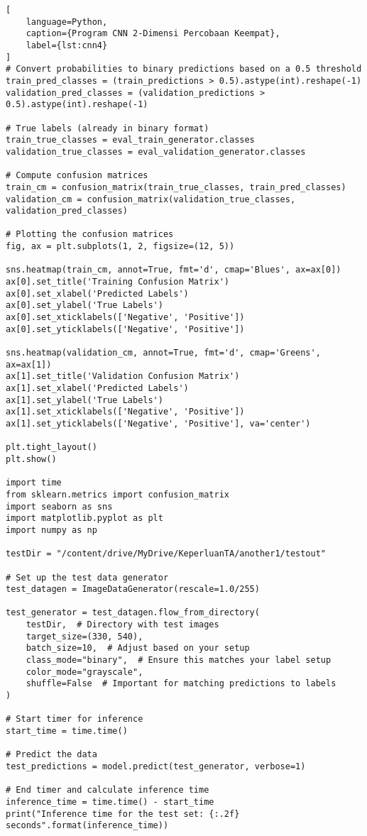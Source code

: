 \begin{lstlisting}[
    language=Python,
    caption={Program CNN 2-Dimensi Percobaan Keempat},
    label={lst:cnn4}
]
# Convert probabilities to binary predictions based on a 0.5 threshold
train_pred_classes = (train_predictions > 0.5).astype(int).reshape(-1)
validation_pred_classes = (validation_predictions > 0.5).astype(int).reshape(-1)

# True labels (already in binary format)
train_true_classes = eval_train_generator.classes
validation_true_classes = eval_validation_generator.classes

# Compute confusion matrices
train_cm = confusion_matrix(train_true_classes, train_pred_classes)
validation_cm = confusion_matrix(validation_true_classes, validation_pred_classes)

# Plotting the confusion matrices
fig, ax = plt.subplots(1, 2, figsize=(12, 5))

sns.heatmap(train_cm, annot=True, fmt='d', cmap='Blues', ax=ax[0])
ax[0].set_title('Training Confusion Matrix')
ax[0].set_xlabel('Predicted Labels')
ax[0].set_ylabel('True Labels')
ax[0].set_xticklabels(['Negative', 'Positive'])
ax[0].set_yticklabels(['Negative', 'Positive'])

sns.heatmap(validation_cm, annot=True, fmt='d', cmap='Greens', ax=ax[1])
ax[1].set_title('Validation Confusion Matrix')
ax[1].set_xlabel('Predicted Labels')
ax[1].set_ylabel('True Labels')
ax[1].set_xticklabels(['Negative', 'Positive'])
ax[1].set_yticklabels(['Negative', 'Positive'], va='center')

plt.tight_layout()
plt.show()

import time
from sklearn.metrics import confusion_matrix
import seaborn as sns
import matplotlib.pyplot as plt
import numpy as np

testDir = "/content/drive/MyDrive/KeperluanTA/another1/testout"

# Set up the test data generator
test_datagen = ImageDataGenerator(rescale=1.0/255)

test_generator = test_datagen.flow_from_directory(
    testDir,  # Directory with test images
    target_size=(330, 540),
    batch_size=10,  # Adjust based on your setup
    class_mode="binary",  # Ensure this matches your label setup
    color_mode="grayscale",
    shuffle=False  # Important for matching predictions to labels
)

# Start timer for inference
start_time = time.time()

# Predict the data
test_predictions = model.predict(test_generator, verbose=1)

# End timer and calculate inference time
inference_time = time.time() - start_time
print("Inference time for the test set: {:.2f} seconds".format(inference_time))


\end{lstlisting}
